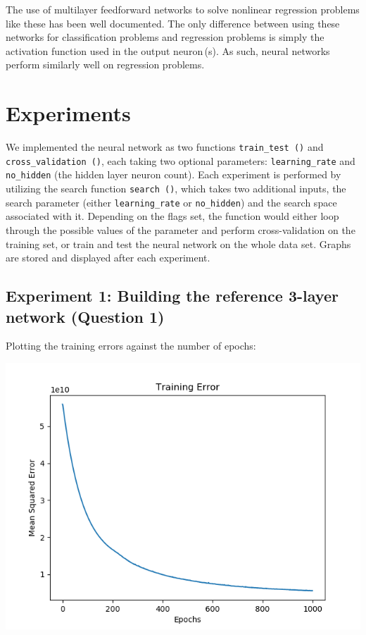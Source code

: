 The use of multilayer feedforward networks to solve nonlinear regression
problems like these has been well documented. The only difference between
using these networks for classification problems and regression problems
is simply the activation function used in the output neuron\,(s). As such,
neural networks perform similarly well on regression problems.

\section*{Experiments}

We implemented the neural network as two functions \texttt{train\_test\,()}
and \texttt{cross\_validation\,()}, each
taking two optional parameters: \texttt{learning\_rate} and
\texttt{no\_hidden} (the hidden layer neuron count).
Each experiment is performed by utilizing the search function
\texttt{search\,()}, which takes two additional inputs, the search parameter
(either \texttt{learning\_rate} or \texttt{no\_hidden}) and the
search space associated with it. Depending on the flags set, the function
would either loop through the possible values of the parameter and perform
cross-validation on the training set, or train and test the neural
network on the whole data set. Graphs are stored and displayed after
each experiment.

\subsection*{Experiment 1: Building the reference 3-layer network (Question 1)}

Plotting the training errors against the number of epochs:

\begin{center}
    \includegraphics[width=\imgw]{images/p1b1_sample_train.png}   
\end{center}

